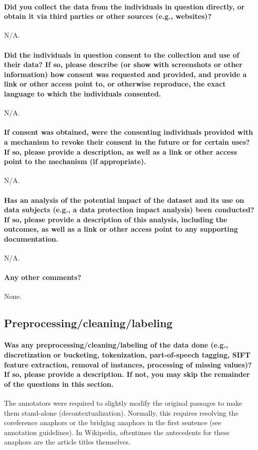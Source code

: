 \documentclass{article}
\begin{document}
\paragraph{Did you collect the data from the individuals in question directly, or obtain it via third parties or other sources (e.g., websites)?}
N/A.

\paragraph{Did the individuals in question consent to the collection and use of their data? If so, please describe (or show with screenshots or other information) how consent was requested and provided, and provide a link or other access point to, or otherwise reproduce, the exact language to which the individuals consented.}
N/A.

\paragraph{If consent was obtained, were the consenting individuals provided with a mechanism to revoke their consent in the future or for certain uses? If so, please provide a description, as well as a link or other access point to the mechanism (if appropriate).}
N/A.

\paragraph{Has an analysis of the potential impact of the dataset and its use on data subjects (e.g., a data protection impact analysis) been conducted? If so, please provide a description of this analysis, including the outcomes, as well as a link or other access point to any supporting documentation.}
N/A.

\paragraph{Any other comments?}
None.



\subsection{Preprocessing/cleaning/labeling}
\paragraph{Was any preprocessing/cleaning/labeling of the data done (e.g., discretization or bucketing,
tokenization, part-of-speech tagging, SIFT feature extraction, removal of instances, processing
of missing values)? If so, please provide a description. If not, you may skip the remainder of the
questions in this section.}
The annotators were required to slightly modify the original passages to make them stand-alone (decontextualization). Normally, this requires resolving the coreference anaphors or the bridging anaphors in the first sentence (see annotation guidelines). In Wikipedia, oftentimes the antecedents for these anaphors are the article titles themselves.
\end{document}
